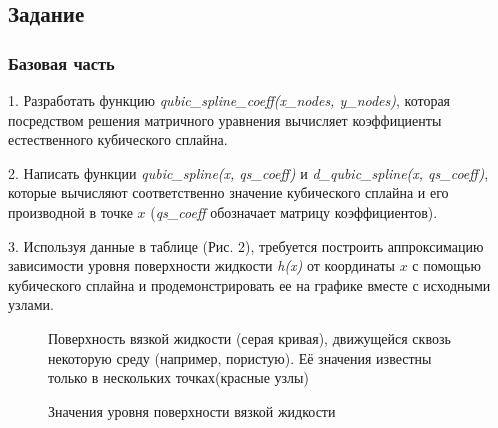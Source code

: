 ﻿%
\subsection*{Задание}\label{blockN.VariantM}

\subsubsection*{Базовая часть}

1. Разработать функцию \textit{qubic_spline_coeff(x_nodes, y_nodes)}, которая посредством решения матричного уравнения вычисляет коэффициенты естественного кубического сплайна.

\begin{flushleft}2. Написать функции \textit{qubic_spline(x, qs_coeff)} и \textit{d_qubic_spline(x, qs_coeff)}, которые вычисляют соответственно значение кубического сплайна и его производной в точке $x$ (\textit{qs_coeff} обозначает матрицу коэффициентов).\end{flushleft}        
\begin{flushleft}
3. Используя данные в таблице (Рис. 2), требуется построить аппроксимацию зависимости уровня поверхности жидкости \textit{h(x)} от координаты $x$ с помощью кубического сплайна и продемонстрировать ее на графике вместе с исходными узлами.
\end{flushleft}
\begin{figure}[h]
\caption{Поверхность вязкой жидкости (серая кривая), движущейся сквозь некоторую среду (например, пористую). Её значения известны только в нескольких точках(красные узлы)}
\end{figure}
\begin{figure}[h]
\caption{Значения уровня поверхности вязкой жидкости}
\end{figure}
